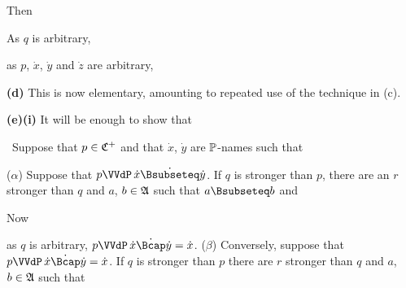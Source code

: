 {

\noindent Then



\noindent As $q$ is arbitrary,


\noindent as $p$, $\dot x$, $\dot y$ and $\dot z$ are arbitrary,


\medskip

{\bf (d)} This is now elementary, amounting to repeated use of the
technique in (c).

\medskip

{\bf (e)(i)} It will be enough to show that


\noindent\Prf\ Suppose that $p\in\frak C^+$ and that $\dot x$,
$\dot y$ are $\Bbb P$-names such that


\noindent($\alpha$) Suppose that $p\VVdP\,\dot x\dot{\Bsubseteq}\dot y$.
If $q$ is stronger than $p$, there are an $r$ stronger than $q$ and $a$,
$b\in\frak A$ such that $a\Bsubseteq b$ and


\noindent Now


\noindent as $q$ is arbitrary, $p\VVdP\,\dot x\dot\Bcap\dot y=\dot x$.
($\beta$) Conversely, suppose that
$p\VVdP\,\dot x\dot\Bcap\dot y=\dot x$.   If $q$ is stronger than $p$ there
are $r$ stronger than $q$ and $a$, $b\in\frak A$ such that


}
